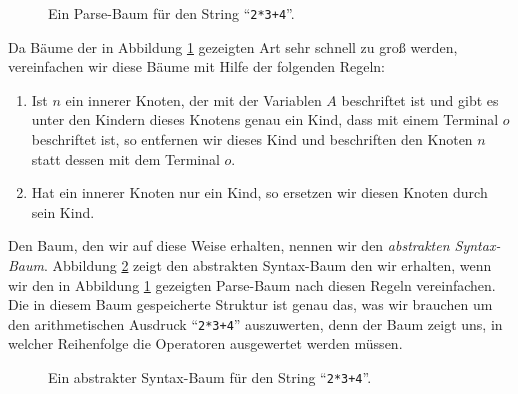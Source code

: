 \begin{figure}[!ht]
  \centering
  \caption{Ein Parse-Baum f\"ur den String ``\texttt{2*3+4}''.}
  \label{fig:parse-tree.dot}
\end{figure}

Da B\"aume der in Abbildung \ref{fig:parse-tree.dot} gezeigten Art sehr schnell zu gro{\ss}
werden, vereinfachen wir diese B\"aume mit Hilfe der folgenden Regeln:
\begin{enumerate}
\item Ist $n$ ein innerer Knoten, der mit der Variablen $A$ beschriftet ist
      und gibt es unter den Kindern dieses Knotens genau ein Kind, dass mit einem Terminal $o$
      beschriftet ist,  so entfernen wir dieses Kind und beschriften den Knoten $n$ statt dessen mit dem
      Terminal $o$.
\item Hat ein innerer Knoten nur ein Kind, so ersetzen wir diesen Knoten durch sein Kind.
\end{enumerate}
Den Baum, den wir auf diese Weise erhalten, nennen wir den \emph{abstrakten Syntax-Baum}.
Abbildung \ref{fig:abstract-syntax-tree.dot} zeigt den abstrakten Syntax-Baum den wir
erhalten, wenn wir den in Abbildung \ref{fig:parse-tree.dot} gezeigten Parse-Baum nach
diesen Regeln vereinfachen.  Die in diesem Baum gespeicherte Struktur ist genau das, was
wir brauchen um den arithmetischen Ausdruck ``\texttt{2*3+4}'' auszuwerten, denn der Baum zeigt uns,
in welcher Reihenfolge die Operatoren ausgewertet werden m\"ussen.

\begin{figure}[!ht]
  \centering
  \caption{Ein abstrakter Syntax-Baum f\"ur den String ``\texttt{2*3+4}''.}
  \label{fig:abstract-syntax-tree.dot}
\end{figure}

